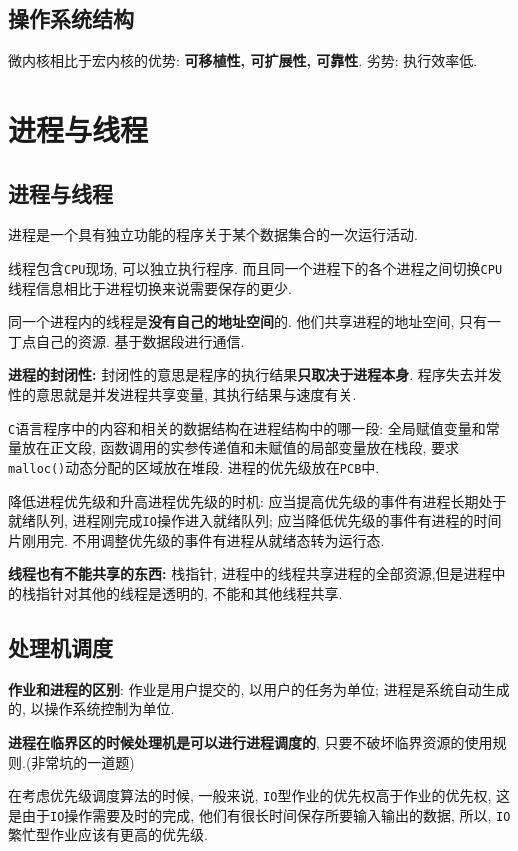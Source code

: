 \section{操作系统结构}
微内核相比于宏内核的优势: \textbf{可移植性, 可扩展性, 可靠性}. 劣势: 执行效率低.
\chapter{进程与线程}
\section{进程与线程}
进程是一个具有独立功能的程序关于某个数据集合的一次运行活动. \par \vspace{.5em}
线程包含\verb|CPU|现场, 可以独立执行程序. 而且同一个进程下的各个进程之间切换\verb|CPU|线程信息相比于进程切换来说需要保存的更少. \par \vspace{.5em}
同一个进程内的线程是\textbf{没有自己的地址空间}的. 他们共享进程的地址空间, 只有一丁点自己的资源. 基于数据段进行通信. \par \vspace{.5em}
\textbf{进程的封闭性:} 封闭性的意思是程序的执行结果\textbf{只取决于进程本身}. 程序失去并发性的意思就是并发进程共享变量, 其执行结果与速度有关.\par \vspace{.5em}
\verb|C|语言程序中的内容和相关的数据结构在进程结构中的哪一段: 全局赋值变量和常量放在正文段, 函数调用的实参传递值和未赋值的局部变量放在栈段, 要求\verb|malloc()|动态分配的区域放在堆段. 进程的优先级放在\verb|PCB|中. \par \vspace{.5em}
降低进程优先级和升高进程优先级的时机: 应当提高优先级的事件有进程长期处于就绪队列, 进程刚完成\verb|IO|操作进入就绪队列; 应当降低优先级的事件有进程的时间片刚用完. 不用调整优先级的事件有进程从就绪态转为运行态.\par \vspace{.5em}
\textbf{线程也有不能共享的东西:} 栈指针, 进程中的线程共享进程的全部资源,但是进程中的栈指针对其他的线程是透明的, 不能和其他线程共享.\par \vspace{.5em}
\section{处理机调度}
\textbf{作业和进程的区别}: 作业是用户提交的, 以用户的任务为单位; 进程是系统自动生成的, 以操作系统控制为单位.\par \vspace{.5em}
\textbf{进程在临界区的时候处理机是可以进行进程调度的}, 只要不破坏临界资源的使用规则.(非常坑的一道题)\par \vspace{.5em}
在考虑优先级调度算法的时候, 一般来说, \verb|IO|型作业的优先权高于作业的优先权, 这是由于\verb|IO|操作需要及时的完成, 他们有很长时间保存所要输入输出的数据, 所以, \verb|IO|繁忙型作业应该有更高的优先级.
